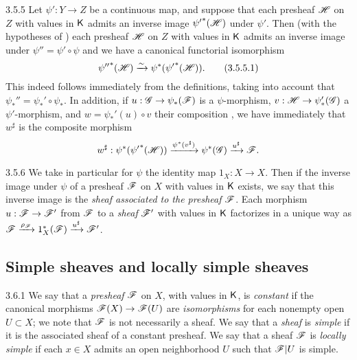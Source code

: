 \begin{env}{3.5.5}
\label{env-0.3.5.5}
Let $\psi':Y\to Z$ be a continuous map, and suppose that each presheaf $\mathscr{H}$ on $Z$ with
values in $\mathsf{K}$ admits an inverse image ${\psi'}^*(\mathscr{H})$ under $\psi'$. Then (with the
hypotheses of ) each presheaf $\mathscr{H}$ on $Z$ with values in $\mathsf{K}$ admits
an inverse image under $\psi''=\psi'\circ\psi$ and we have a canonical functorial isomorphism
\[
  {\psi''}^*(\mathscr{H})\xrightarrow{\sim}\psi^*({\psi'}^*(\mathscr{H})).
  \tag{3.5.5.1}
\]
This indeed follows immediately from the definitions, taking into account that
$\psi_*''=\psi_*'\circ\psi_*$. In addition, if $u:\mathscr{G}\to\psi_*(\mathscr{F})$ is a
$\psi$-morphism, $v:\mathscr{H}\to\psi_*'(\mathscr{G})$ a $\psi'$-morphism, and $w=\psi_*'(u)\circ v$
their composition , we have immediately that $w^\sharp$ is the composite
morphism
\[
  w^\sharp:\psi^*({\psi'}^*(\mathscr{H}))\xrightarrow{\psi^*(v^\sharp)}\psi^*(\mathscr{G})
  \xrightarrow{u^\sharp}\mathscr{F}.
\]
\end{env}

\begin{env}{3.5.6}
\label{env-0.3.5.6}
We take in particular for $\psi$ the identity map $1_X:X\to X$. Then if the inverse image
under $\psi$ of a presheaf $\mathscr{F}$ on $X$ with values in $\mathsf{K}$ exists, we say that this
inverse image is the \emph{sheaf associated to the presheaf $\mathscr{F}$}. Each morphism
$u:\mathscr{F}\to\mathscr{F}'$ from $\mathscr{F}$ to a \emph{sheaf} $\mathscr{F}'$ with values in $\mathsf{K}$ factorizes
in a unique way as
$\mathscr{F}\xrightarrow{\rho_\mathscr{F}}1_X^*(\mathscr{F})\xrightarrow{u^\sharp}\mathscr{F}'$.
\end{env}

\subsection{Simple sheaves and locally simple sheaves}
\label{0-prelim-3.6}

\begin{env}{3.6.1}
\label{env-0.3.6.1}
We say that a \emph{presheaf} $\mathscr{F}$ on $X$, with values in $\mathsf{K}$, is \emph{constant} if
the canonical morphisms $\mathscr{F}(X)\to\mathscr{F}(U)$ are \emph{isomorphisms} for each nonempty
open $U\subset X$; we note that $\mathscr{F}$ is not necessarily a sheaf. We say that a
\emph{sheaf} is \emph{simple} if it is the associated sheaf  of a constant
presheaf. We say that a sheaf $\mathscr{F}$ is \emph{locally simple} if each $x\in X$ admits an
open neighborhood $U$ such that $\mathscr{F}|U$ is simple.
\end{env}

